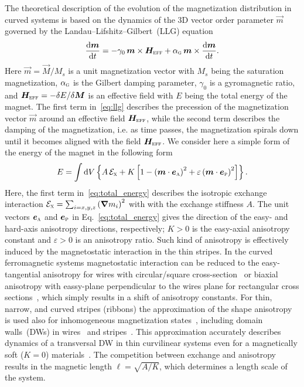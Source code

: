 The theoretical description of the evolution of the magnetization distribution in curved systems is based on the dynamics of the 3D vector order parameter $\vec{m}$ governed by the Landau--Lifshitz--Gilbert~(LLG) equation
\begin{equation}\label{eq:llg}
    \frac{\mathrm{d}\vec{m}}{\mathrm{d}t}=-\gamma_0\, \vec{m}\times\vec{H}_\textsc{eff} + \alpha_\textsc{g}\, \vec{m}\times\frac{\mathrm{d}\vec{m}}{\mathrm{d}t}.
\end{equation}
Here $\vec{m}=\vec{M}/M_s$ is a unit magnetization vector with $M_s$ being the saturation magnetization, $\alpha_\textsc{g}$ is the Gilbert damping parameter, $\gamma_0$ is a gyromagnetic ratio, and $\vec{H}_\textsc{eff}=-\delta E/\delta\vec{M}$ is an effective field with $E$ being the total energy of the magnet. The first term in~\eqref{eq:llg} describes the precession of the magnetization vector $\vec{m}$ around an effective field $\vec{H}_\textsc{eff}$, while the second term describes the damping of the  magnetization, i.e. as time passes, the magnetization spirals down until it becomes aligned with the field $\vec{H}_\textsc{eff}$.  We consider here a simple form of the energy of the magnet in the following form
\begin{equation}\label{eq:total_energy}
	E=\int\mathrm{d}V\left\{A\,\mathcal{E}_\textsc{x}+K\left[1-\left(\vec{m}\cdot\vec{e}_\textsc{a}\right)^2+\varepsilon\left(\vec{m}\cdot\vec{e}_\textsc{p}\right)^2\right]\right\}.
\end{equation}
Here, the first term in~\eqref{eq:total_energy} describes the isotropic exchange interaction $\mathcal{E}_\textsc{x}=\sum_{i=x,y,z}\left(\vec{\nabla} m_i\right)^2$ with with the exchange stiffness $A$. The unit vectors $\vec{e}_\textsc{a}$ and $\vec{e}_\textsc{p}$ in Eq.~\eqref{eq:total_energy} gives the direction of the easy- and hard-axis anisotropy directions, respectively; $K>0$ is the easy-axial anisotropy constant and $\varepsilon>0$ is an anisotropy ratio. Such kind of anisotropy is effectively induced by the magnetostatic interaction in the thin stripes. In the curved ferromagnetic systems magnetostatic interaction can be reduced to the easy-tangential anisotropy for wires with circular/square cross-section~\cite{Slastikov12} or biaxial anisotropy with eassy-plane perpendicular to the wires plane for rectangular cross sections~\cite{Aharoni98,Gaididei17a}, which simply results in a shift of anisotropy constants. For thin, narrow, and curved stripes (ribbons) the approximation of the shape anisotropy is used also for inhomogeneous magnetization states~\cite{Gaididei17a}, including domain walls~(DWs) in wires~\cite{Yershov15b,Yershov16,Pylypovskyi16} and stripes~\cite{Yershov18a,Volkov19c}. This approximation accurately describes dynamics of a transversal DW in thin curvilinear systems even for a magnetically soft ($K = 0$) materials~\cite{Yershov15b,Yershov16,Pylypovskyi16,Yershov18a,Volkov19c}.  The competition between exchange and anisotropy results in the magnetic length $\ell=\sqrt{A/K}$, which determines a length scale of the system.

